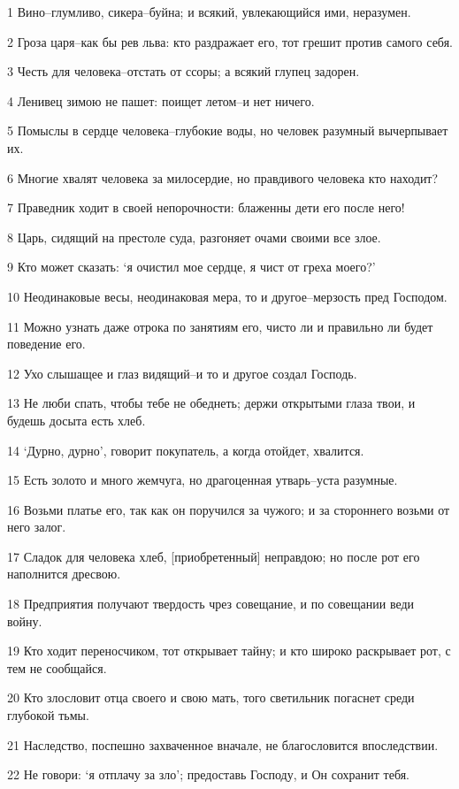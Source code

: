 \par 1 Вино--глумливо, сикера--буйна; и всякий, увлекающийся ими, неразумен.
\par 2 Гроза царя--как бы рев льва: кто раздражает его, тот грешит против самого себя.
\par 3 Честь для человека--отстать от ссоры; а всякий глупец задорен.
\par 4 Ленивец зимою не пашет: поищет летом--и нет ничего.
\par 5 Помыслы в сердце человека--глубокие воды, но человек разумный вычерпывает их.
\par 6 Многие хвалят человека за милосердие, но правдивого человека кто находит?
\par 7 Праведник ходит в своей непорочности: блаженны дети его после него!
\par 8 Царь, сидящий на престоле суда, разгоняет очами своими все злое.
\par 9 Кто может сказать: `я очистил мое сердце, я чист от греха моего?'
\par 10 Неодинаковые весы, неодинаковая мера, то и другое--мерзость пред Господом.
\par 11 Можно узнать даже отрока по занятиям его, чисто ли и правильно ли будет поведение его.
\par 12 Ухо слышащее и глаз видящий--и то и другое создал Господь.
\par 13 Не люби спать, чтобы тебе не обеднеть; держи открытыми глаза твои, и будешь досыта есть хлеб.
\par 14 `Дурно, дурно', говорит покупатель, а когда отойдет, хвалится.
\par 15 Есть золото и много жемчуга, но драгоценная утварь--уста разумные.
\par 16 Возьми платье его, так как он поручился за чужого; и за стороннего возьми от него залог.
\par 17 Сладок для человека хлеб, [приобретенный] неправдою; но после рот его наполнится дресвою.
\par 18 Предприятия получают твердость чрез совещание, и по совещании веди войну.
\par 19 Кто ходит переносчиком, тот открывает тайну; и кто широко раскрывает рот, с тем не сообщайся.
\par 20 Кто злословит отца своего и свою мать, того светильник погаснет среди глубокой тьмы.
\par 21 Наследство, поспешно захваченное вначале, не благословится впоследствии.
\par 22 Не говори: `я отплачу за зло'; предоставь Господу, и Он сохранит тебя.

